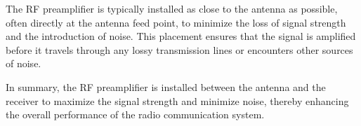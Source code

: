 The RF preamplifier is typically installed as close to the antenna as possible, often directly at the antenna feed point, to minimize the loss of signal strength and the introduction of noise. This placement ensures that the signal is amplified before it travels through any lossy transmission lines or encounters other sources of noise.

In summary, the RF preamplifier is installed between the antenna and the receiver to maximize the signal strength and minimize noise, thereby enhancing the overall performance of the radio communication system.


